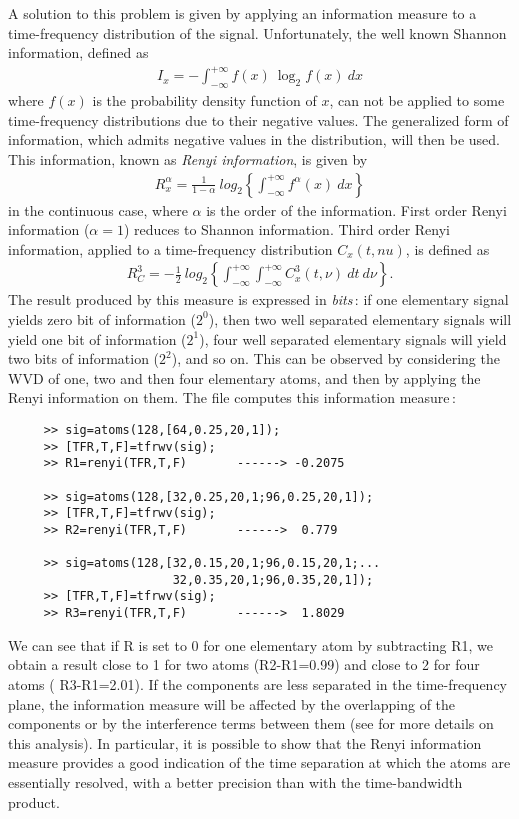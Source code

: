  A solution to this problem is given by applying an information measure to
a time-frequency distribution of the signal. Unfortunately, the well known
Shannon information, defined as 
\begin{eqnarray*}
I_x = -\int_{-\infty}^{+\infty} f(x)\ \log_2 f(x)\ dx
\end{eqnarray*}
where $f(x)$ is the probability density function of $x$, can not be applied
to some time-frequency distributions due to their negative values. The
generalized form of information, which admits negative values in the
distribution, will then be used. This information, known as {\it Renyi
information}, is given by
\begin{eqnarray*}
R_x^{\alpha} =  \frac{1}{1-\alpha}\ log_2\left\{\int_{-\infty}^{+\infty}
f^{\alpha}(x)\ dx\right\} 
\end{eqnarray*}
in the continuous case, where $\alpha$ is the order of the
information. First order Renyi information ($\alpha=1$) reduces to Shannon
information. Third order Renyi information, applied to a time-frequency
distribution $C_x(t,nu)$, is defined as
\begin{eqnarray*}
R_C^3 = -\frac{1}{2}\
log_2\left\{\int_{-\infty}^{+\infty}\int_{-\infty}^{+\infty} C_x^3(t,\nu)\
dt\ d\nu\right\}. 
\end{eqnarray*}
The result produced by this measure is expressed in {\it bits}\index{bits
of information}\,: if one elementary signal yields zero bit of information
($2^0$), then two well separated elementary signals will yield one bit of
information ($2^1$), four well separated elementary signals will yield two
bits of information ($2^2$), and so on. This can be observed by considering
the WVD of one, two and then four elementary atoms, and then by applying
the Renyi information on them. The file \index{\ttfamily renyi}{\ttfamily
renyi.m} computes this information measure\,:
\begin{verbatim}
     >> sig=atoms(128,[64,0.25,20,1]); 
     >> [TFR,T,F]=tfrwv(sig);
     >> R1=renyi(TFR,T,F)       ------> -0.2075

     >> sig=atoms(128,[32,0.25,20,1;96,0.25,20,1]); 
     >> [TFR,T,F]=tfrwv(sig);
     >> R2=renyi(TFR,T,F)       ------>  0.779

     >> sig=atoms(128,[32,0.15,20,1;96,0.15,20,1;...
                       32,0.35,20,1;96,0.35,20,1]);  
     >> [TFR,T,F]=tfrwv(sig);
     >> R3=renyi(TFR,T,F)       ------>  1.8029
\end{verbatim}
We can see that if {\ttfamily R} is set to 0 for one elementary atom by
subtracting {\ttfamily R1}, we obtain a result close to 1 for two atoms
({\ttfamily R2-R1}=0.99) and close to 2 for four atoms ({\ttfamily
R3-R1}=2.01). If the components are less separated in the time-frequency
plane, the information measure will be affected by the overlapping of the
components or by the interference terms between them (see \cite{WIL91} for
more details on this analysis). In particular, it is possible to show that
the Renyi information measure provides a good indication of the time
separation at which the atoms are essentially resolved, with a better
precision than with the time-bandwidth product.


